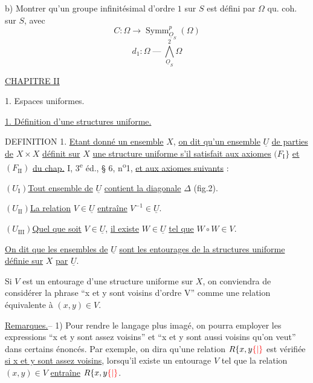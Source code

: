 b) Montrer qu'un groupe infinitésimal d'ordre $1$ sur $S$
est défini par $\Omega$ qu. coh. sur $S$, avec
\[
C:\Omega\longrightarrow\operatorname{Symm}_{\underline O_S}^p(\Omega)
\]
\[
d_1:\Omega\mathbin{\text{---}}\bigwedge_{\underline O_S}^2\Omega
\]

\uline{CHAPITRE II}


1. Espaces uniformes.

\uline{1. Définition d'une structures uniforme.}

DEFINITION 1. \uline{Etant donné un ensemble} $X$, \uline{on dit qu'un ensemble} $\underline U$ \uline{de parties de}
$X\times X$ \uline{définit sur} $X$ \uline{une structure uniforme s'il satisfait aux axiomes}
$(F_{\mathrm I}\}$ \uline{et} $(F_{\mathrm{II}})$ \uline{du chap.} I, 3\textsuperscript{e} éd., § 6, n\textsuperscript{o}1, \uline{et aux axiomes suivants} :

$(U_{\mathrm I})$\quad \uline{Tout ensemble de} $\underline U$ \uline{contient la diagonale} $\Delta$ (fig.2).

$(U_{\mathrm{II}})$\quad \uline{La relation} $V\in\underline U$ \uline{entraîne} $V^{-1}\in\underline U$.

$(U_{\mathrm{III}})$\quad \uline{Quel que soit} $V\in\underline U$, \uline{il existe} $W\in\underline U$ \uline{tel que} $W\circ W\in V$.

\uline{On dit que les ensembles de} $\underline U$ \uline{sont les entourages de la structures uniforme définie sur} $X$ \uline{par} $\underline U$.

Si $V$ est un entourage d'une structure uniforme sur $X$, on conviendra de
considérer la phrase ``x et y sont voisins d'ordre V'' comme une relation équivalente à $(x,y)\in V$.

\uline{Remarques.}-- 1) Pour rendre le langage plus imagé, on pourra employer
les expressions ``x et y sont assez voisins'' et ``x et y sont aussi
voisins qu'on veut'' dans certains énoncés. Par exemple, on dira
qu'une relation $R\{x,y{\color{red}\{|\}}$ est vérifiée \uline{si x et y sont assez voisins},
lorsqu'il existe un entourage $V$ tel que la relation $(x,y)\in V$ \uline{entraîne} $R\{x,y{\color{red}\{|\}}$.

